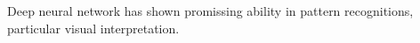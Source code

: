 Deep neural network has shown promissing ability in pattern recognitions, particular visual interpretation.

